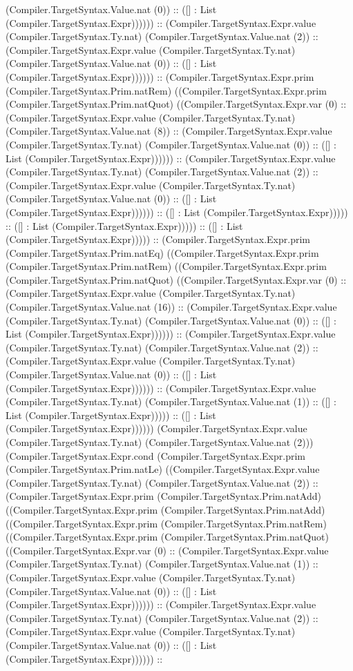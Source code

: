 \documentclass[11pt]{article}
\begin{document}
(Compiler.TargetSyntax.Value.nat (0)) :: ([] : List (Compiler.TargetSyntax.Expr)))))) :: (Compiler.TargetSyntax.Expr.value (Compiler.TargetSyntax.Ty.nat) (Compiler.TargetSyntax.Value.nat (2)) :: (Compiler.TargetSyntax.Expr.value (Compiler.TargetSyntax.Ty.nat) (Compiler.TargetSyntax.Value.nat (0)) :: ([] : List (Compiler.TargetSyntax.Expr)))))) :: (Compiler.TargetSyntax.Expr.prim (Compiler.TargetSyntax.Prim.natRem) ((Compiler.TargetSyntax.Expr.prim (Compiler.TargetSyntax.Prim.natQuot) ((Compiler.TargetSyntax.Expr.var (0) :: (Compiler.TargetSyntax.Expr.value (Compiler.TargetSyntax.Ty.nat) (Compiler.TargetSyntax.Value.nat (8)) :: (Compiler.TargetSyntax.Expr.value (Compiler.TargetSyntax.Ty.nat) (Compiler.TargetSyntax.Value.nat (0)) :: ([] : List (Compiler.TargetSyntax.Expr)))))) :: (Compiler.TargetSyntax.Expr.value (Compiler.TargetSyntax.Ty.nat) (Compiler.TargetSyntax.Value.nat (2)) :: (Compiler.TargetSyntax.Expr.value (Compiler.TargetSyntax.Ty.nat) (Compiler.TargetSyntax.Value.nat (0)) :: ([] : List (Compiler.TargetSyntax.Expr)))))) :: ([] : List (Compiler.TargetSyntax.Expr))))) :: ([] : List (Compiler.TargetSyntax.Expr))))) :: ([] : List (Compiler.TargetSyntax.Expr))))) :: (Compiler.TargetSyntax.Expr.prim (Compiler.TargetSyntax.Prim.natEq) ((Compiler.TargetSyntax.Expr.prim (Compiler.TargetSyntax.Prim.natRem) ((Compiler.TargetSyntax.Expr.prim (Compiler.TargetSyntax.Prim.natQuot) ((Compiler.TargetSyntax.Expr.var (0) :: (Compiler.TargetSyntax.Expr.value (Compiler.TargetSyntax.Ty.nat) (Compiler.TargetSyntax.Value.nat (16)) :: (Compiler.TargetSyntax.Expr.value (Compiler.TargetSyntax.Ty.nat) (Compiler.TargetSyntax.Value.nat (0)) :: ([] : List (Compiler.TargetSyntax.Expr)))))) :: (Compiler.TargetSyntax.Expr.value (Compiler.TargetSyntax.Ty.nat) (Compiler.TargetSyntax.Value.nat (2)) :: (Compiler.TargetSyntax.Expr.value (Compiler.TargetSyntax.Ty.nat) (Compiler.TargetSyntax.Value.nat (0)) :: ([] : List (Compiler.TargetSyntax.Expr)))))) :: (Compiler.TargetSyntax.Expr.value (Compiler.TargetSyntax.Ty.nat) (Compiler.TargetSyntax.Value.nat (1)) :: ([] : List (Compiler.TargetSyntax.Expr))))) :: ([] : List (Compiler.TargetSyntax.Expr)))))) (Compiler.TargetSyntax.Expr.value (Compiler.TargetSyntax.Ty.nat) (Compiler.TargetSyntax.Value.nat (2))) (Compiler.TargetSyntax.Expr.cond (Compiler.TargetSyntax.Expr.prim (Compiler.TargetSyntax.Prim.natLe) ((Compiler.TargetSyntax.Expr.value (Compiler.TargetSyntax.Ty.nat) (Compiler.TargetSyntax.Value.nat (2)) :: (Compiler.TargetSyntax.Expr.prim (Compiler.TargetSyntax.Prim.natAdd) ((Compiler.TargetSyntax.Expr.prim (Compiler.TargetSyntax.Prim.natAdd) ((Compiler.TargetSyntax.Expr.prim (Compiler.TargetSyntax.Prim.natRem) ((Compiler.TargetSyntax.Expr.prim (Compiler.TargetSyntax.Prim.natQuot) ((Compiler.TargetSyntax.Expr.var (0) :: (Compiler.TargetSyntax.Expr.value (Compiler.TargetSyntax.Ty.nat) (Compiler.TargetSyntax.Value.nat (1)) :: (Compiler.TargetSyntax.Expr.value (Compiler.TargetSyntax.Ty.nat) (Compiler.TargetSyntax.Value.nat (0)) :: ([] : List (Compiler.TargetSyntax.Expr)))))) :: (Compiler.TargetSyntax.Expr.value (Compiler.TargetSyntax.Ty.nat) (Compiler.TargetSyntax.Value.nat (2)) :: (Compiler.TargetSyntax.Expr.value (Compiler.TargetSyntax.Ty.nat) (Compiler.TargetSyntax.Value.nat (0)) :: ([] : List (Compiler.TargetSyntax.Expr)))))) :: 
\end{document}
